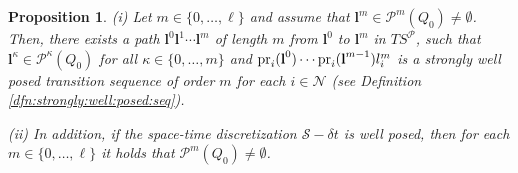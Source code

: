 \documentclass[reqno]{amsart}
\theoremstyle{plain}
\newtheorem{prop}[thm]{Proposition}
\theoremstyle{definition}
\numberwithin{equation}{section}
\begin{document}
\begin{prop} \label{propostion:Post:nonempty}
\textit{(i)} Let $m\in\{0,\ldots,\ell\}$  and assume that ${\textbf{{l}}}^m\in  {\ensuremath{\mathcal{P}}}^m(Q_0)\ne\emptyset$. Then, there exists a path ${\textbf{{l}}}^0 {\textbf{{l}}}^1\cdots{\textbf{{l}}}^{m}$ of length $m$ from ${\textbf{{l}}}^0$ to ${\textbf{{l}}}^m$ in $TS^{\ensuremath{\mathcal{P}}}$, such that ${\textbf{{l}}}^{\kappa}\in{\ensuremath{\mathcal{P}}}^{\kappa}(Q_0)$ for all $\kappa\in\{0,\ldots,m\} $ and ${\rm pr}_i({\textbf{{l}}}^0)\cdots{\rm pr}_i({\textbf{{l}}}^{m-1})l^m_i$ is a strongly well posed transition sequence of order $m$ for each $i\in{\ensuremath{\mathcal{N}}}$ (see Definition \ref{dfn:strongly:well:posed:seq}).

\noindent \textit{(ii)} In addition, if the space-time discretization ${\ensuremath{\mathcal{S}}}-\delta t$ is well posed, then for each  $m\in\{0,\ldots,\ell\}$  it holds that $ {\ensuremath{\mathcal{P}}}^m(Q_0)\ne\emptyset$.
\end{prop}
\end{document}
